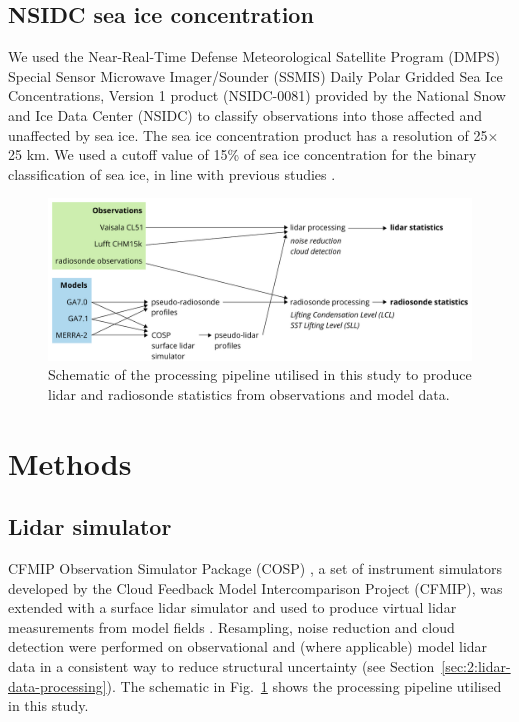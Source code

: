 \subsection{NSIDC sea ice concentration}

We used the Near-Real-Time Defense Meteorological Satellite Program (DMPS)
Special Sensor Microwave Imager/Sounder (SSMIS) Daily Polar Gridded Sea Ice
Concentrations, Version 1 product (NSIDC-0081) \citep{maslanik1999} provided by
the National Snow and Ice Data Center (NSIDC) to classify observations into
those affected and unaffected by sea ice. The sea ice concentration product has
a resolution of 25$\times$25 \unit{km}. We used a cutoff value of 15\% of sea
ice concentration for the binary classification of sea ice, in line with
previous studies \citep{comiso2008}.

\begin{figure}[t]
\centering
\includegraphics[width=\textwidth]{chapter2/fig/schematic.pdf}
\caption[Schematic of the processing pipeline]{
Schematic of the processing pipeline utilised in this study to produce lidar and
radiosonde statistics from observations and model data.
}
\label{fig:2:schematic}
\end{figure}

\section{Methods}

\subsection{Lidar simulator}

CFMIP Observation Simulator Package (COSP) \citep{bodas-salcedo2011}, a set of
instrument simulators developed by the Cloud Feedback Model Intercomparison
Project (CFMIP), was extended with a surface lidar simulator and used to produce
virtual lidar measurements from model fields \citep{kuma2020b}. Resampling, noise
reduction and cloud detection were performed on observational and (where
applicable) model lidar data in a consistent way to reduce structural
uncertainty (see Section~\ref{sec:2:lidar-data-processing}). The schematic in
Fig.~\ref{fig:2:schematic} shows the processing pipeline utilised in this study.

